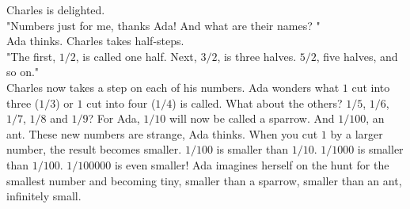 Charles is delighted.\\
"Numbers just for me, thanks Ada! And what are their names? " \\
Ada thinks. Charles takes half-steps. \\
"The first, $1/2$, is called one half. Next, $3/2$, is three halves. $5/2$, five halves, and so on." \\
Charles now takes a step on each of his numbers.
Ada wonders what $1$ cut into three ($1/3$) or $1$ cut into four ($1/4$) is called. What about the others? $1/5$, $1/6$, $1/7$, $1/8$ and $1/9$? For Ada, $1/10$ will now be called a sparrow. And $1/100$, an ant. 
These new numbers are strange, Ada thinks. When you cut $1$ by a larger number, the result becomes smaller.
$1/100$ is smaller than $1/10$. $1/1000$ is smaller than $1/100$. $1/100000$ is even smaller! Ada imagines herself on the hunt for the smallest number and becoming tiny, smaller than a sparrow, smaller than an ant, infinitely small.
